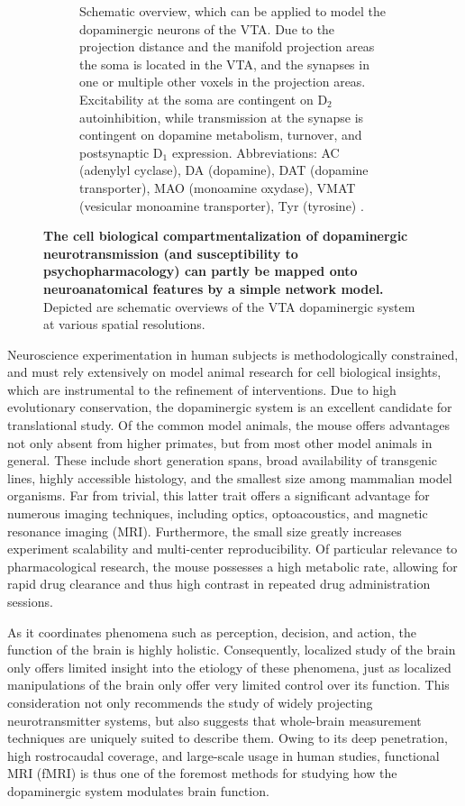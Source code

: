 \begin{sansmath}
\begin{figure}[h!]
\begin{subfigure}{.985\textwidth}
		\caption{
			Schematic overview, which can be applied to model the dopaminergic neurons of the VTA.
			Due to the projection distance and the manifold projection areas the soma is located in the VTA, and the synapses in one or multiple other voxels in the projection areas.
			Excitability at the soma are contingent on $\mathrm{D_2}$ autoinhibition, while transmission at the synapse is contingent on dopamine metabolism, turnover, and postsynaptic $\mathrm{D_1}$ expression.
			Abbreviations: AC (adenylyl cyclase), DA (dopamine), DAT (dopamine transporter), MAO (monoamine oxydase), VMAT (vesicular monoamine transporter), Tyr (tyrosine) \cite{Torres2003}.
			}
		\label{fig:cm}
	\end{subfigure}
	\caption{
		\textbf{The cell biological compartmentalization of dopaminergic neurotransmission (and susceptibility to psychopharmacology) can partly be mapped onto neuroanatomical features by a simple network model.}
		Depicted are schematic overviews of the VTA dopaminergic system at various spatial resolutions.
		}
	\label{fig:m}
\end{figure}
\end{sansmath}

Neuroscience experimentation in human subjects is methodologically constrained, and must rely extensively on model animal research for cell biological insights, which are instrumental to the refinement of interventions.
Due to high evolutionary conservation, the dopaminergic system is an excellent candidate for translational study.
Of the common model animals, the mouse offers advantages not only absent from higher primates, but from most other model animals in general.
These include short generation spans, broad availability of transgenic lines, highly accessible histology, and the smallest size among mammalian model organisms.
Far from trivial, this latter trait offers a significant advantage for numerous imaging techniques, including optics, optoacoustics, and magnetic resonance imaging (MRI).
Furthermore, the small size greatly increases experiment scalability and multi-center reproducibility.
Of particular relevance to pharmacological research, the mouse possesses a high metabolic rate, allowing for rapid drug clearance and thus high contrast in repeated drug administration sessions.

As it coordinates phenomena such as perception, decision, and action, the function of the brain is highly holistic.
Consequently, localized study of the brain only offers limited insight into the etiology of these phenomena, just as localized manipulations of the brain only offer very limited control over its function.
This consideration not only recommends the study of widely projecting neurotransmitter systems, but also suggests that whole-brain measurement techniques are uniquely suited to describe them.
Owing to its deep penetration, high rostrocaudal coverage, and large-scale usage in human studies, functional MRI (fMRI) is thus one of the foremost methods for studying how the dopaminergic system modulates brain function.

